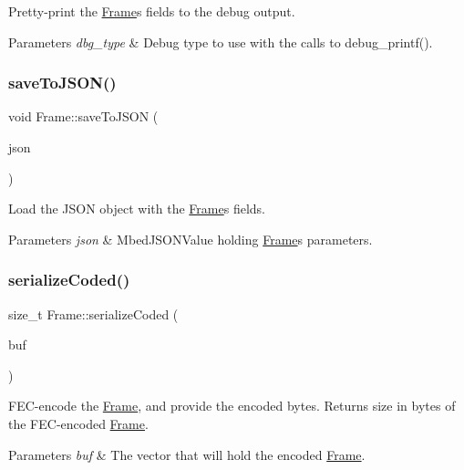 Pretty-\/print the \hyperlink{classFrame}{Frame}\textquotesingle{}s fields to the debug output. 
\begin{DoxyParams}{Parameters}
{\em dbg\+\_\+type} & Debug type to use with the calls to debug\+\_\+printf(). \\
\hline
\end{DoxyParams}
\mbox{\label{classFrame_a865ca9d9a5584fab74d7258012509b97}} 
\subsubsection{\texorpdfstring{save\+To\+J\+S\+O\+N()}{saveToJSON()}}
{\footnotesize\ttfamily void Frame\+::save\+To\+J\+S\+ON (\begin{DoxyParamCaption}\item[{Mbed\+J\+S\+O\+N\+Value \&}]{json }\end{DoxyParamCaption})}

Load the J\+S\+ON object with the \hyperlink{classFrame}{Frame}\textquotesingle{}s fields. 
\begin{DoxyParams}{Parameters}
{\em json} & Mbed\+J\+S\+O\+N\+Value holding \hyperlink{classFrame}{Frame}\textquotesingle{}s parameters. \\
\hline
\end{DoxyParams}
\mbox{\label{classFrame_a2e1d5421694ec4d9abaadacf2b32b492}} 
\subsubsection{\texorpdfstring{serialize\+Coded()}{serializeCoded()}}
{\footnotesize\ttfamily size\+\_\+t Frame\+::serialize\+Coded (\begin{DoxyParamCaption}\item[{vector$<$ uint8\+\_\+t $>$ \&}]{buf }\end{DoxyParamCaption})}

F\+E\+C-\/encode the \hyperlink{classFrame}{Frame}, and provide the encoded bytes. Returns size in bytes of the F\+E\+C-\/encoded \hyperlink{classFrame}{Frame}. 
\begin{DoxyParams}{Parameters}
{\em buf} & The vector that will hold the encoded \hyperlink{classFrame}{Frame}. \\
\hline
\end{DoxyParams}
\mbox{\label{classFrame_a950b26a59c2f2716662a09964e5d95d1}} 
